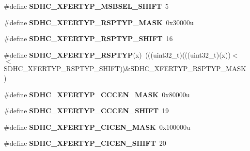 \begin{DoxyCompactItemize}
\item 
\#define {\bfseries S\+D\+H\+C\+\_\+\+X\+F\+E\+R\+T\+Y\+P\+\_\+\+M\+S\+B\+S\+E\+L\+\_\+\+S\+H\+I\+FT}~5\hypertarget{group__SDHC__Register__Masks_ga9f13f1a35f73d15da1cb2e89a6919e30}{}\label{group__SDHC__Register__Masks_ga9f13f1a35f73d15da1cb2e89a6919e30}

\item 
\#define {\bfseries S\+D\+H\+C\+\_\+\+X\+F\+E\+R\+T\+Y\+P\+\_\+\+R\+S\+P\+T\+Y\+P\+\_\+\+M\+A\+SK}~0x30000u\hypertarget{group__SDHC__Register__Masks_ga0ed8f044a988ab8f1017f9f17c6087a5}{}\label{group__SDHC__Register__Masks_ga0ed8f044a988ab8f1017f9f17c6087a5}

\item 
\#define {\bfseries S\+D\+H\+C\+\_\+\+X\+F\+E\+R\+T\+Y\+P\+\_\+\+R\+S\+P\+T\+Y\+P\+\_\+\+S\+H\+I\+FT}~16\hypertarget{group__SDHC__Register__Masks_gabcc1b92e4008ae1b4b0ad594d09906c1}{}\label{group__SDHC__Register__Masks_gabcc1b92e4008ae1b4b0ad594d09906c1}

\item 
\#define {\bfseries S\+D\+H\+C\+\_\+\+X\+F\+E\+R\+T\+Y\+P\+\_\+\+R\+S\+P\+T\+YP}(x)~(((uint32\+\_\+t)(((uint32\+\_\+t)(x))$<$$<$S\+D\+H\+C\+\_\+\+X\+F\+E\+R\+T\+Y\+P\+\_\+\+R\+S\+P\+T\+Y\+P\+\_\+\+S\+H\+I\+FT))\&S\+D\+H\+C\+\_\+\+X\+F\+E\+R\+T\+Y\+P\+\_\+\+R\+S\+P\+T\+Y\+P\+\_\+\+M\+A\+SK)\hypertarget{group__SDHC__Register__Masks_gaf2c43c5373367a04ff30a95428d1c0f5}{}\label{group__SDHC__Register__Masks_gaf2c43c5373367a04ff30a95428d1c0f5}

\item 
\#define {\bfseries S\+D\+H\+C\+\_\+\+X\+F\+E\+R\+T\+Y\+P\+\_\+\+C\+C\+C\+E\+N\+\_\+\+M\+A\+SK}~0x80000u\hypertarget{group__SDHC__Register__Masks_ga685761802ba9bd3a16540f0b4cf1815d}{}\label{group__SDHC__Register__Masks_ga685761802ba9bd3a16540f0b4cf1815d}

\item 
\#define {\bfseries S\+D\+H\+C\+\_\+\+X\+F\+E\+R\+T\+Y\+P\+\_\+\+C\+C\+C\+E\+N\+\_\+\+S\+H\+I\+FT}~19\hypertarget{group__SDHC__Register__Masks_ga8d90ea7df50316ee6c8902df84662c4c}{}\label{group__SDHC__Register__Masks_ga8d90ea7df50316ee6c8902df84662c4c}

\item 
\#define {\bfseries S\+D\+H\+C\+\_\+\+X\+F\+E\+R\+T\+Y\+P\+\_\+\+C\+I\+C\+E\+N\+\_\+\+M\+A\+SK}~0x100000u\hypertarget{group__SDHC__Register__Masks_ga6ab41eef488a5bd6074f0ce44d67fe92}{}\label{group__SDHC__Register__Masks_ga6ab41eef488a5bd6074f0ce44d67fe92}

\item 
\#define {\bfseries S\+D\+H\+C\+\_\+\+X\+F\+E\+R\+T\+Y\+P\+\_\+\+C\+I\+C\+E\+N\+\_\+\+S\+H\+I\+FT}~20\hypertarget{group__SDHC__Register__Masks_ga23f6e1c33faf0b718dfaaef43b678084}{}\label{group__SDHC__Register__Masks_ga23f6e1c33faf0b718dfaaef43b678084}


\end{DoxyCompactItemize}
